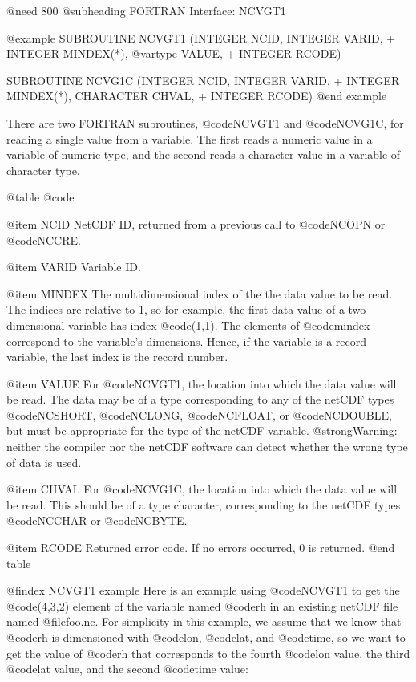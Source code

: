 @need 800
@subheading FORTRAN Interface:  NCVGT1

@example
      SUBROUTINE NCVGT1 (INTEGER NCID, INTEGER VARID,
     + INTEGER MINDEX(*), @var{type} VALUE,
     + INTEGER RCODE)

      SUBROUTINE NCVG1C (INTEGER NCID, INTEGER VARID,
     + INTEGER MINDEX(*), CHARACTER CHVAL,
     + INTEGER RCODE)
@end example

There are two FORTRAN subroutines, @code{NCVGT1} and @code{NCVG1C}, for
reading a single value from a variable.  The first reads a numeric value
in a variable of numeric type, and the second reads a character value in
a variable of character type.

@table @code

@item NCID
NetCDF ID, returned from a previous call to @code{NCOPN} or
@code{NCCRE}.

@item VARID
Variable ID.

@item MINDEX
The multidimensional index of the the data value to be read.  The
indices are relative to 1, so for example, the first data value of a
two-dimensional variable has index @code{(1,1)}.  The elements of
@code{mindex} correspond to the variable's dimensions.  Hence, if the
variable is a record variable, the last index is the record number.

@item VALUE
For @code{NCVGT1}, the location into which the data value will be read.
The data may be of a type corresponding to any of the netCDF types
@code{NCSHORT}, @code{NCLONG}, @code{NCFLOAT}, or @code{NCDOUBLE}, but
must be appropriate for the type of the netCDF variable.
@strong{Warning: neither the compiler nor the netCDF software can detect
whether the wrong type of data is used.}

@item CHVAL
For @code{NCVG1C}, the location into which the data value will be read.
This should be of a type character, corresponding to the netCDF types
@code{NCCHAR} or @code{NCBYTE}.

@item RCODE
Returned error code.  If no errors occurred, 0 is returned.
@end table

@findex NCVGT1 example
Here is an example using @code{NCVGT1} to get the @code{(4,3,2)} element
of the variable named @code{rh} in an existing netCDF file named
@file{foo.nc}.  For simplicity in this example, we assume that we know
that @code{rh} is dimensioned with @code{lon}, @code{lat}, and
@code{time}, so we want to get the value of @code{rh} that corresponds
to the fourth @code{lon} value, the third @code{lat} value, and the
second @code{time} value:

